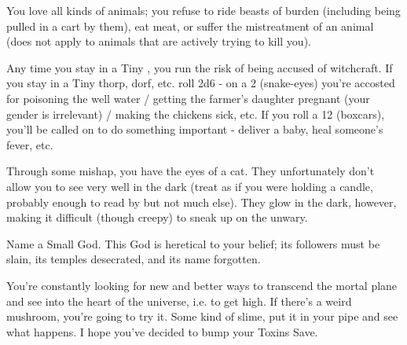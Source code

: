 \begin{multicols*}{2}
\newpage


    \begin{center}
    \end{center}


  You love all kinds of animals; you refuse to ride beasts of burden (including being pulled in a cart by them), eat meat, or suffer the mistreatment of an animal (does not apply to animals that are actively trying to kill you).

  
  Any time you stay in a Tiny , you run the risk of being accused of witchcraft. If you stay in a Tiny thorp, dorf, etc. roll 2d6 - on a 2 (snake-eyes) you're accosted for poisoning the well water / getting the farmer's daughter pregnant (your gender is irrelevant) / making the chickens sick, etc. If you roll a 12 (boxcars), you'll be called on to do something important - deliver a baby, heal someone's fever, etc.


  Through some mishap, you have the eyes of a cat. They unfortunately don't allow you to see very well in the dark (treat as if you were holding a candle, probably enough to read by but not much else). They glow in the dark, however, making it difficult (though creepy) to sneak up on the unwary.


  Name a Small God. This God is heretical to your belief; its followers must be slain, its temples desecrated, and its name forgotten.

\cbreak


  You're constantly looking for new and better ways to transcend the mortal plane and see into the heart of the universe, i.e. to get high. If there's a weird mushroom, you're going to try it. Some kind of slime, put it in your pipe and see what happens. I hope you've decided to bump your Toxins Save.



\end{multicols*}
